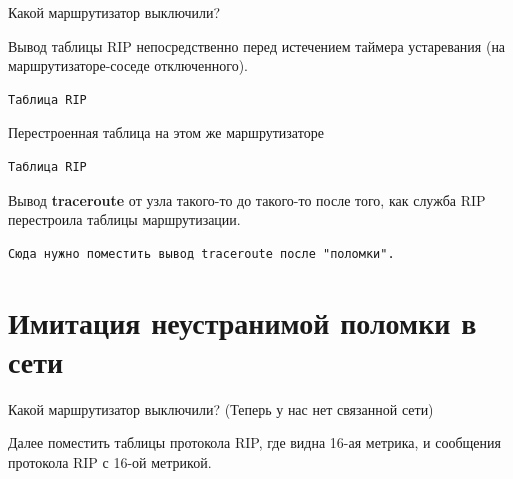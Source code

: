 \documentclass[a4paper,12pt]{article}
\begin{document}
Какой маршрутизатор выключили?

Вывод таблицы RIP непосредственно перед истечением таймера устаревания (на маршрутизаторе-соседе отключенного).

\begin{Verbatim}
Таблица RIP
\end{Verbatim}

Перестроенная таблица на этом же маршрутизаторе

\begin{Verbatim}
Таблица RIP
\end{Verbatim}


Вывод \textbf{traceroute} от узла такого-то до такого-то после того, как служба RIP перестроила таблицы маршрутизации.

\begin{Verbatim}
Сюда нужно поместить вывод traceroute после "поломки".
\end{Verbatim}

\section{Имитация неустранимой поломки в сети}

Какой маршрутизатор выключили? (Теперь у нас нет связанной сети)

Далее поместить таблицы протокола RIP, где видна 16-ая метрика, и сообщения протокола RIP с 16-ой метрикой.
\end{document}
